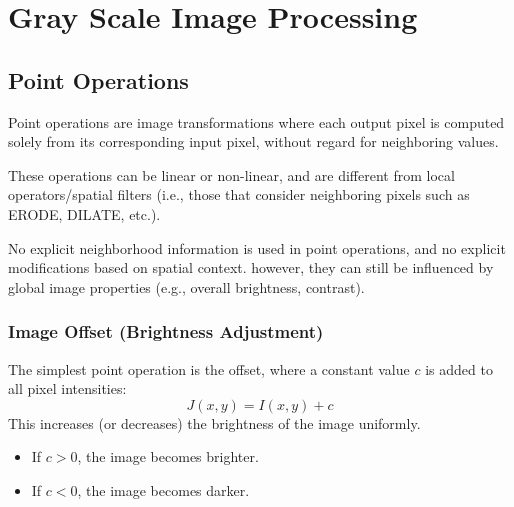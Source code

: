 \chapter{Gray Scale Image Processing}

\section{Point Operations}

Point operations are image transformations where each output pixel is computed solely from its corresponding input pixel, without regard for neighboring values.


These operations can be linear or non-linear, and are different from local operators/spatial filters (i.e., those that consider neighboring pixels such as ERODE, DILATE, etc.).

No explicit neighborhood information is used in point operations, and no explicit modifications based on spatial context. however, they can still be influenced by global image properties (e.g., overall brightness, contrast).



\subsection{Image Offset (Brightness Adjustment)}
The simplest point operation is the offset, where a constant value $c$ is added to all pixel intensities:
$$
J(x, y) = I(x, y) + c
$$
This increases (or decreases) the brightness of the image uniformly.
\begin{itemize}
    \item If $c > 0$, the image becomes brighter.
    \item If $c < 0$, the image becomes darker.
\end{itemize}


